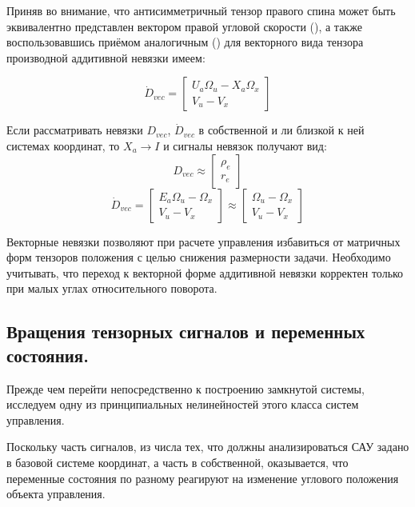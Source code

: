 \documentclass[a4paper]{article}
\begin{document}
Приняв во внимание, что антисимметричный тензор правого спина может быть эквивалентно представлен вектором правой угловой скорости (), а также воспользовавшись приёмом аналогичным () для векторного вида тензора производной аддитивной невязки имеем:

\begin{equation}\dot{D}_{vec} = \begin{bmatrix}U_a\Omega_u-X_a\Omega_x\\ V_u-V_x\end{bmatrix}\end{equation}

Если рассматривать невязки $D_{vec}$, $\dot{D}_{vec}$ в собственной и ли близкой к ней системах координат, то $X_a\rightarrow I$ и сигналы невязок получают вид:
\begin{equation} D_{vec} \approx \begin{bmatrix}\rho_e\\r_e\end{bmatrix} \end{equation}
\begin{equation}\dot{D}_{vec} = \begin{bmatrix}E_a\Omega_u-\Omega_x\\ V_u-V_x\end{bmatrix}
\approx\begin{bmatrix}\Omega_u-\Omega_x\\ V_u-V_x\end{bmatrix}
\end{equation}

Векторные невязки позволяют при расчете управления избавиться от матричных форм тензоров положения с целью снижения размерности задачи. Необходимо учитывать, что переход к векторной форме аддитивной невязки корректен только при малых углах относительного поворота.

\subsection{Вращения тензорных сигналов и переменных состояния.}
Прежде чем перейти непосредственно к построению замкнутой системы, исследуем одну из принципиальных нелинейностей этого класса систем управления.

Поскольку часть сигналов, из числа тех, что должны анализироваться САУ задано в базовой системе координат, а часть в собственной, оказывается, что переменные состояния по разному реагируют на изменение углового положения объекта управления. 
\end{document}
